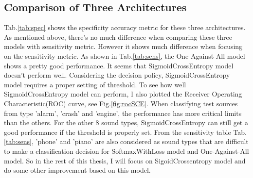 \subsection{Comparison of Three Architectures}
Tab.\ref{tab:spec} shows the specificity accuracy metric for these three architectures. As mentioned above, there's no much difference when comparing these three models with sensitivity metric. However it shows much difference when focusing on the sensitivity metric. As shown in Tab.\ref{tab:sens}, the One-Against-All model shows a pretty good performance. It seems that SigmoidCrossEntropy model doesn't perform well. Considering the decision policy, SigmoidCrossEntropy model requires a proper setting of threshold. To see how well SigmoidCrossEntropy model can perform, I also plotted the Receiver Operating Characteristic(ROC) curve, see Fig.\ref{fig:rocSCE}. When classifying test sources from type 'alarm', 'crash' and 'engine', the performance has more critical limits than the others. For the other 8 sound types, SigmoidCrossEntropy can still get a good performance if the threshold is properly set. From the sensitivity table Tab.\ref{tab:sens}, 'phone' and 'piano' are also considered as sound types that are difficult to make a classification decision for SoftmaxWithLoss model and One-Against-All model. So in the rest of this thesis, I will focus on SigoidCrossentropy model and do some other improvement based on this model.

